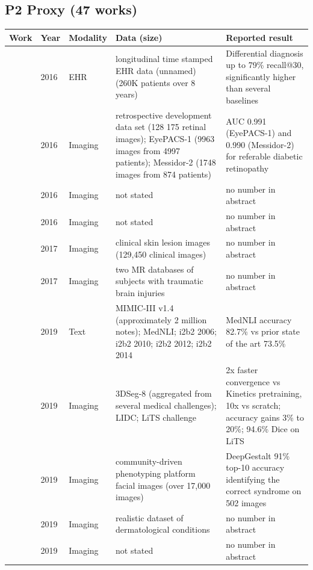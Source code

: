 \subsection*{P2 Proxy (47 works)}
\begin{longtable}{@{}p{2.6cm}p{0.7cm}p{1.2cm}p{4.4cm}p{4.6cm}@{}}
\toprule
Work & Year & Modality & Data (size) & Reported result\\
\midrule
\endhead
\cite{choi2016doctor} & 2016 & EHR & longitudinal time stamped EHR data (unnamed) (260K patients over 8 years) & Differential diagnosis up to 79\% recall@30, significantly higher than several baselines\\
\cite{gulshan2016development} & 2016 & Imaging & retrospective development data set (128 175 retinal images); EyePACS-1 (9963 images from 4997 patients); Messidor-2 (1748 images from 874 patients) & AUC 0.991 (EyePACS-1) and 0.990 (Messidor-2) for referable diabetic retinopathy\\
\cite{shin2016deep} & 2016 & Imaging & not stated & no number in abstract\\
\cite{tajbakhsh2016convolutional} & 2016 & Imaging & not stated & no number in abstract\\
\cite{esteva2017dermatologist} & 2017 & Imaging & clinical skin lesion images (129,450 clinical images) & no number in abstract\\
\cite{kamnitsas2017unsupervised} & 2017 & Imaging & two MR databases of subjects with traumatic brain injuries & no number in abstract\\
\cite{alsentzer2019publicly} & 2019 & Text & MIMIC-III v1.4 (approximately 2 million notes); MedNLI; i2b2 2006; i2b2 2010; i2b2 2012; i2b2 2014 & MedNLI accuracy 82.7\% vs prior state of the art 73.5\%\\
\cite{chen2019med3d} & 2019 & Imaging & 3DSeg-8 (aggregated from several medical challenges); LIDC; LiTS challenge & 2x faster convergence vs Kinetics pretraining, 10x vs scratch; accuracy gains 3\% to 20\%; 94.6\% Dice on LiTS\\
\cite{gurovich2019identifying} & 2019 & Imaging & community-driven phenotyping platform facial images (over 17,000 images) & DeepGestalt 91\% top-10 accuracy identifying the correct syndrome on 502 images\\
\cite{prabhu2019few} & 2019 & Imaging & realistic dataset of dermatological conditions & no number in abstract\\
\cite{raghu2019transfusion} & 2019 & Imaging & not stated & no number in abstract\\

\end{longtable}
